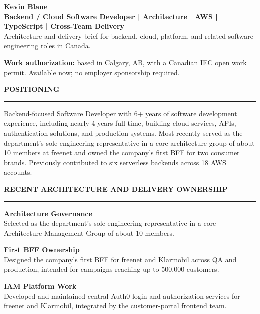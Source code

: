 \documentclass[10pt,a4paper]{article}
\newcommand{\sectiontitle}[1]{%
  \vspace{3.2mm}%
  {\large\bfseries\MakeUppercase{#1}}\\[-3mm]%
  {\color{rule}\rule{\linewidth}{0.45pt}}%
  \vspace{1.2mm}%
}
\begin{document}
{\fontsize{27pt}{29pt}\selectfont\bfseries Kevin Blaue}\\[0.8mm]
{\color{accent}\bfseries Backend / Cloud Software Developer | Architecture | AWS | TypeScript | Cross-Team Delivery}\\[0.8mm]
{\color{muted}\small Architecture and delivery brief for backend, cloud, platform, and related software engineering roles in Canada.}

\vspace{2.2mm}
\begin{tcolorbox}[
  colback=permit,
  colframe=permit,
  boxrule=0pt,
  arc=1mm,
  boxsep=1.8mm,
  left=1.5mm,
  right=1.5mm,
  top=1mm,
  bottom=1mm
]
\textbf{Work authorization:} based in Calgary, AB, with a Canadian IEC open work permit.
Available now; no employer sponsorship required.
\end{tcolorbox}

\sectiontitle{Positioning}

Backend-focused Software Developer with 6+ years of software development experience, including nearly 4 years full-time, building cloud services, APIs, authentication solutions, and production systems. Most recently served as the department's sole engineering representative in a core architecture group of about 10 members at freenet and owned the company's first BFF for two consumer brands. Previously contributed to six serverless backends across 18 AWS accounts.

\sectiontitle{Recent Architecture and Delivery Ownership}

\begin{tcbraster}[
  raster columns=3,
  raster equal height,
  raster column skip=3mm,
  raster left skip=0pt,
  raster right skip=0pt
]
\begin{briefcard}
\textbf{Architecture Governance}\\[0.5mm]
Selected as the department's sole engineering representative in a core Architecture Management Group of about 10 members.
\end{briefcard}
\begin{briefcard}
\textbf{First BFF Ownership}\\[0.5mm]
Designed the company's first BFF for freenet and Klarmobil across QA and production, intended for campaigns reaching up to 500,000 customers.
\end{briefcard}
\begin{briefcard}
\textbf{IAM Platform Work}\\[0.5mm]
Developed and maintained central Auth0 login and authorization services for freenet and Klarmobil, integrated by the customer-portal frontend team.
\end{briefcard}
\end{tcbraster}
\end{document}
